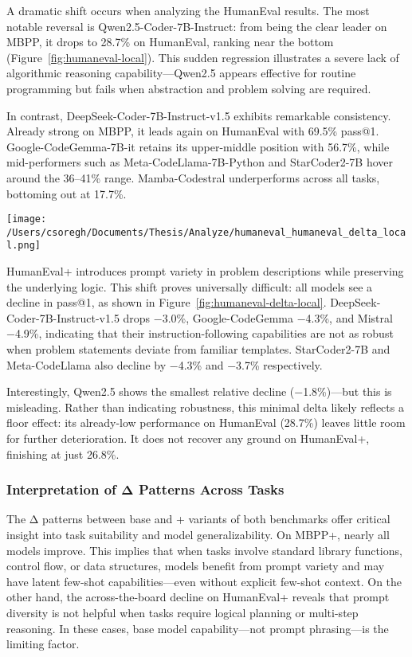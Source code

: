 A dramatic shift occurs when analyzing the HumanEval results. The most notable reversal is Qwen2.5-Coder-7B-Instruct: from being the clear leader on MBPP, it drops to 28.7\% on HumanEval, ranking near the bottom (Figure~\ref{fig:humaneval-local}). This sudden regression illustrates a severe lack of algorithmic reasoning capability—Qwen2.5 appears effective for routine programming but fails when abstraction and problem solving are required.

In contrast, DeepSeek-Coder-7B-Instruct-v1.5 exhibits remarkable consistency. Already strong on MBPP, it leads again on HumanEval with 69.5\% pass@1. Google-CodeGemma-7B-it retains its upper-middle position with 56.7\%, while mid-performers such as Meta-CodeLlama-7B-Python and StarCoder2-7B hover around the 36–41\% range. Mamba-Codestral underperforms across all tasks, bottoming out at 17.7\%.

\begin{center}
	\texttt{[image: /Users/csoregh/Documents/Thesis/Analyze/humaneval\_humaneval\_delta\_local.png]}
	\label{fig:humaneval-delta-local}
\end{center}

HumanEval+ introduces prompt variety in problem descriptions while preserving the underlying logic. This shift proves universally difficult: all models see a decline in pass@1, as shown in Figure~\ref{fig:humaneval-delta-local}. DeepSeek-Coder-7B-Instruct-v1.5 drops −3.0\%, Google-CodeGemma −4.3\%, and Mistral −4.9\%, indicating that their instruction-following capabilities are not as robust when problem statements deviate from familiar templates. StarCoder2-7B and Meta-CodeLlama also decline by −4.3\% and −3.7\% respectively.

Interestingly, Qwen2.5 shows the smallest relative decline (−1.8\%)—but this is misleading. Rather than indicating robustness, this minimal delta likely reflects a floor effect: its already-low performance on HumanEval (28.7\%) leaves little room for further deterioration. It does not recover any ground on HumanEval+, finishing at just 26.8\%.

\subsubsection*{Interpretation of Δ Patterns Across Tasks}

The Δ patterns between base and + variants of both benchmarks offer critical insight into task suitability and model generalizability. On MBPP+, nearly all models improve. This implies that when tasks involve standard library functions, control flow, or data structures, models benefit from prompt variety and may have latent few-shot capabilities—even without explicit few-shot context. On the other hand, the across-the-board decline on HumanEval+ reveals that prompt diversity is not helpful when tasks require logical planning or multi-step reasoning. In these cases, base model capability—not prompt phrasing—is the limiting factor.

